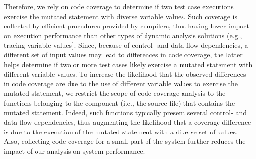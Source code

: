 Therefore, we rely on code coverage to determine if two test case executions exercise the mutated statement with diverse variable values. Such coverage is collected by efficient procedures provided by compilers, thus having lower impact on execution performance than other types of dynamic analysis solutions (e.g., tracing variable values).
Since, because of control- and data-flow dependencies, a different set of input values may lead to differences in code coverage,
the latter helps determine if two or more test cases likely exercise a mutated statement with different variable values. %
To increase the likelihood that the observed differences in code coverage are due to the use of different variable values to exercise the mutated statement, we restrict the scope of code coverage analysis
to the functions belonging to the component (i.e., the source file) that contains the mutated statement.
Indeed, such functions typically present several control- and data-flow dependencies, thus
augmenting the likelihood that a coverage difference is due to the execution of the mutated statement with a diverse set of values. Also, collecting code coverage for a small part of the system further reduces the impact of our analysis on system performance.


